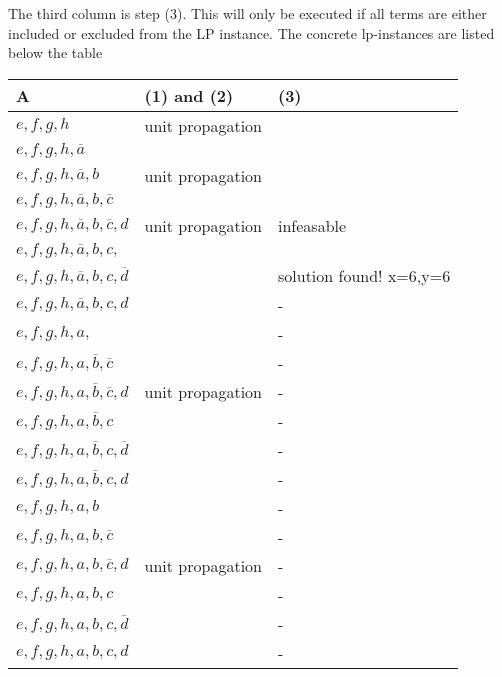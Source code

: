 \documentclass{base}
\begin{document}
The third column is step (3). This will only be executed if all terms are either included or excluded from the LP instance.
The concrete lp-instances are listed below the table

\begin{tabular}[]{|l|l|l|}
\hline
\textbf{A}                              & \textbf{(1) and (2)} & \textbf{(3)}\\ \hline
$e,f,g,h$                               & unit propagation & \\ \hline
$e,f,g,h,\overline a$                   &                  & \\ \hline
$e,f,g,h,\overline a,b$                 & unit propagation & \\ \hline
$e,f,g,h,\overline a,b, \overline c$    &                  & \\ \hline
$e,f,g,h,\overline a,b, \overline c, d$ & unit propagation & infeasable\\ \hline
$e,f,g,h,\overline a,b, c, $            &                  & \\ \hline
$e,f,g,h,\overline a,b, c, \overline d$ &                  & solution found! x=6,y=6\\ \hline
$e,f,g,h,\overline a,b, c, d$           &                  & -\\ \hline
$e,f,g,h,a,$                            &                  & -\\ \hline
$e,f,g,h,a,\overline b, \overline c$    &                  & -\\ \hline
$e,f,g,h,a,\overline b, \overline c, d$ & unit propagation & -\\ \hline
$e,f,g,h,a,\overline b, c$              &                  & -\\ \hline
$e,f,g,h,a,\overline b, c, \overline d$ &                  & -\\ \hline
$e,f,g,h,a,\overline b, c, d$           &                  & -\\ \hline
$e,f,g,h,a, b$                          &                  & -\\ \hline
$e,f,g,h,a, b, \overline c$             &                  & -\\ \hline
$e,f,g,h,a, b, \overline c, d$          & unit propagation & -\\ \hline
$e,f,g,h,a, b, c$                       &                  & -\\ \hline
$e,f,g,h,a, b, c, \overline d$          &                  & -\\ \hline
$e,f,g,h,a, b, c, d$                    &                  & -\\ \hline
\end{tabular}
\end{document}
